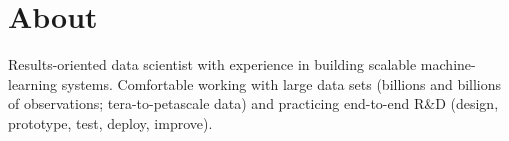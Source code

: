\documentclass[print]{friggeri-cv} %
\begin{document}
\section{About}
Results-oriented data scientist with experience in building scalable
machine-learning systems. Comfortable working
with large data sets (billions and billions of observations; tera-to-petascale
data) and practicing end-to-end R\&D (design, prototype, test, deploy,
improve).

\iftoggle{cv}
{\section{Research/Work Experience}
}
{\section{Selected Experience}
}
\end{document}
